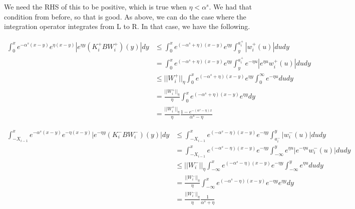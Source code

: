 \documentclass[12pt]{article}
\begin{document}
We need the RHS of this to be positive, which is true when $\eta < \alpha^s$. We had that condition from before, so that is good. As above, we can do the case where the integration operator integrates from L to R. In that case, we have the following.

\begin{align*}
\int_0^x e^{-\alpha^s (x-y)}e^{\eta(x-y)}|e^{\eta y} (K_i^+ B W_i^+)(y)| dy &\leq \int_0^x e^{(-\alpha^s + \eta)(x-y)}e^{\eta y} \int_y^{a_i^+} |w_i^+(u)| du dy \\
&= \int_0^x e^{(-\alpha^s + \eta)(x-y)}e^{\eta y} \int_y^{a_i^+} e^{-\eta u} |e^{\eta u} w_i^+(u)| du dy \\
&\leq ||W_i^+||_\eta \int_0^x e^{(-\alpha^s + \eta)(x-y)}e^{\eta y} \int_0^\infty e^{-\eta u} du dy \\
&= \frac{||W_i^+||_\eta}{\eta} \int_0^x e^{(-\alpha^s + \eta)(x-y)}e^{\eta y} dy \\
&= \frac{||W_i^+||_\eta}{\eta} \frac{1 - e^{-(\alpha^s - \eta)x}}{\alpha^s - \eta} 
\end{align*}

\begin{align*}
\int_{-X_{i-1}}^x e^{-\alpha^s (x-y)}e^{-\eta(x-y)}|e^{-\eta y} (K_i^- B W_i^-)(y)| dy &\leq \int_{-X_{i-1}}^x e^{(-\alpha^s - \eta)(x-y)}e^{-\eta y} \int_{a_i^-}^y |w_i^-(u)| du dy \\
&= \int_{-X_{i-1}}^x e^{(-\alpha^s - \eta)(x-y)}e^{-\eta y} \int_{-\infty}^y e^{\eta u} |e^{-\eta u} w_i^-(u)| du dy \\
&\leq ||W_i^-||_\eta \int_{-\infty}^x e^{(-\alpha^s - \eta)(x-y)}e^{-\eta y} \int_{-\infty}^y e^{\eta u} du dy \\
&= \frac{||W_i^-||_\eta}{\eta} \int_{-\infty}^x e^{(-\alpha^s - \eta)(x-y)}e^{-\eta y} e^{\eta y} dy \\
&= \frac{||W_i^-||_\eta}{\eta} \frac{1}{\alpha^s + \eta}
\end{align*}
\end{document}

